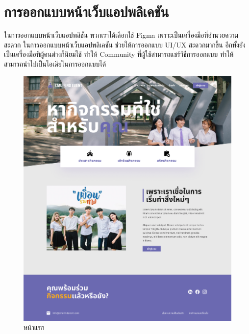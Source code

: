 \section{การออกแบบหน้าเว็บแอปพลิเคชัน}
ในการออกแบบหน้าเว็บแอปพลิชัน พวกเราได้เลือกใช้ Figma เพราะเป็นเครื่องมือที่อำนวยความสะดวก ในการออกแบบหน้าเว็บแอปพลิเคชัน ช่วยให้การออกแบบ UI/UX สะดวกมากขึ้น อีกทั้งยังเป็นเครื่องมือที่ผู้คนต่างก็นิยมใช้
ทำให้ Community ที่ผู้ใช้สามารถแชร์วิธีการออกแบบ ทำให้สามารถนำไปเป็นไอเดียในการออกแบบได้ 
\begin{figure}[h]
\begin{center}
\includegraphics[width=0.5\linewidth]{image/Figma-design/Main-not-login.png}
\end{center}
\caption[Poem]{หน้าแรก}
\label{fig:main}
\end{figure}

